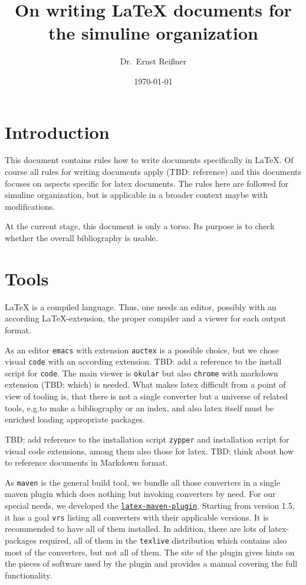 \documentclass[a4paper,12pt]{article}
\title{On writing \LaTeX{} documents for the simuline organization}
\author{Dr.~Ernst Reißner}
\date{\today}
\begin{document}
\maketitle


\newpage

\tableofcontents %
\listoffigures
\listoftables

\section{Introduction}

This document contains rules how to write documents specifically in \LaTeX. 
Of course all rules for writing documents apply (TBD\@: reference) 
and this documents focuses on aspects specific for latex documents. 
The rules here are followed for simuline organization, 
but is applicable in a broader context maybe with modifications. 

At the current stage, this document is only a torso. 
Its purpose is to check whether the overall bibliography is usable. 


\section{Tools}\label{sec:tools}

\LaTeX{} is a compiled language. 
Thus, one needs an editor, possibly with an according \LaTeX-extension, 
the proper compiler and a viewer for each output format. 

As an editor \texttt{emacs} with extension \texttt{auctex} 
is a possible choice, but we chose visual \texttt{code} with an according extension. 
TBD\@: add a reference to the install script for \texttt{code}. 
The main viewer is \texttt{okular} but also \texttt{chrome} with markdown extension (TBD\@: which) 
is needed. 
What makes latex difficult from a point of view of tooling is, 
that there is not a single converter but a universe of related tools, 
e.g.\@ to make a bibliography or an index, 
and also latex itself must be enriched loading appropriate packages. 

TBD\@: add reference to the installation script \texttt{zypper} 
and installation script for visual code extensions, among them also those for latex. 
TBD\@: think about how to reference documents in Markdown format. 


As \texttt{maven} is the general build tool, we bundle all those converters 
in a single maven plugin which does nothing but invoking converters by need. 
For our special needs, we developed the 
\href{https://github.com/Reissner/latex-maven-plugin}{\texttt{latex-maven-plugin}}. 
Starting from version 1.5, it has a goal \texttt{vrs} listing all converters 
with their applicable versions. 
It is recommended to have all of them installed. 
In addition, there are lots of latex-packages required, 
all of them in the \texttt{texlive} distribution 
which contains also most of the converters, but not all of them. 
The site of the plugin gives hints on the pieces of software used by the plugin 
and provides a manual covering the full functionality. 
\end{document}
